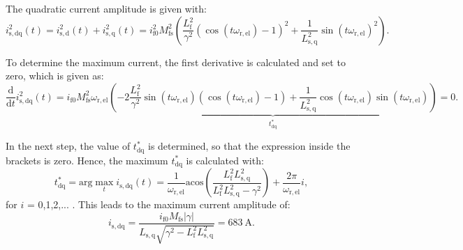 
\begin{solutionblock}
    The quadratic current amplitude is given with:
    \begin{equation}
        i_{\mathrm{s,dq}}^2(t) = i_{\mathrm{s,d}}^2(t) + i_{\mathrm{s,q}}^2(t)
        = i_{\mathrm{f0}}^2 M_{\mathrm{fs}}^2 \left(\frac{L_{\mathrm{f}}^2}{\gamma^2}(\cos(t\omega_{\mathrm{r,el}})-1)^2 + \frac{1}{L_{\mathrm{s,q}}^2}\sin(t\omega_{\mathrm{r,el}})^2\right).
    \end{equation}

    To determine the maximum current, the first derivative is calculated and set to zero, which is given as:
    \begin{equation}
        \frac{\mathrm{d}}{\mathrm{d}t} i_{\mathrm{s,dq}}^2(t)
        = i_{\mathrm{f0}}M_{\mathrm{fs}}^2 \omega_{\mathrm{r,el}} 
        \underbrace{
        \left(-2\frac{L_{\mathrm{f}}^2}{\gamma^2}\sin(t\omega_{\mathrm{r,el}}) (\cos(t\omega_{\mathrm{r,el}})-1) + \frac{1}{L_{\mathrm{s,q}}^2} \cos(t\omega_{\mathrm{r,el}}) \sin(t\omega_{\mathrm{r,el}}) \right)
        }_{t_{\mathrm{dq}}^{*}}
        = 0.
    \end{equation}

    In the next step, the value of $t_{\mathrm{dq}}^*$ is determined, so that the expression inside the brackets is zero.
    Hence, the maximum $t_{\mathrm{dq}}^*$ is calculated with:
    \begin{equation}
        t_{\mathrm{dq}}^{*} = \mathrm{arg}\max\limits_{t} i_{\mathrm{s,dq}}(t)
        = \frac{1}{\omega_{\mathrm{r,el}}} \mathrm{acos} \left(\frac{L_{\mathrm{f}}^2 L_{\mathrm{s,q}}^2}{L_{\mathrm{f}}^2 L_{\mathrm{s,q}}^2 - \gamma^2}\right) + \frac{2\pi}{\omega_{\mathrm{r,el}}}i,
    \end{equation}
    for $i$ = 0,1,2,... . This leads to the maximum current amplitude of:
    \begin{equation}
        i_{\mathrm{s,dq}} = \frac{i_{\mathrm{f0}} M_{\mathrm{fs}} |\gamma| }{L_{\mathrm{s,q}} \sqrt{\gamma^2 - L_{\mathrm{f}}^2 L_{\mathrm{s,q}}^2}}
        = \SI{683}{\ampere}.
    \end{equation}
\end{solutionblock}



